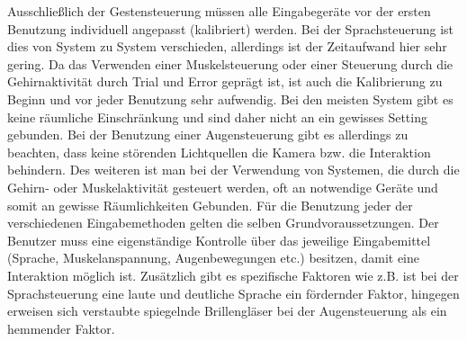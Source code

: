 \newline \newline
Ausschließlich der Gestensteuerung müssen alle Eingabegeräte vor der ersten Benutzung individuell angepasst (kalibriert) werden. Bei der Sprachsteuerung ist dies von System zu System verschieden, allerdings ist der Zeitaufwand hier sehr gering. Da das Verwenden einer Muskelsteuerung oder einer Steuerung durch die Gehirnaktivität durch Trial und Error geprägt ist, ist auch die Kalibrierung zu Beginn und vor jeder Benutzung sehr aufwendig.
\newline \newline
Bei den meisten System gibt es keine räumliche Einschränkung und sind daher nicht an ein gewisses Setting gebunden. Bei der Benutzung einer Augensteuerung gibt es allerdings zu beachten, dass keine störenden Lichtquellen die Kamera bzw. die Interaktion behindern. Des weiteren ist man bei der Verwendung von Systemen, die durch die Gehirn- oder Muskelaktivität gesteuert werden, oft an notwendige Geräte und somit an gewisse Räumlichkeiten Gebunden.
\newline \newline
Für die Benutzung jeder der verschiedenen Eingabemethoden gelten die selben Grundvoraussetzungen. Der Benutzer muss eine eigenständige Kontrolle über das jeweilige Eingabemittel (Sprache, Muskelanspannung, Augenbewegungen etc.) besitzen, damit eine Interaktion möglich ist. Zusätzlich gibt es spezifische Faktoren wie z.B. ist bei der Sprachsteuerung eine laute und deutliche Sprache ein fördernder Faktor, hingegen erweisen sich verstaubte spiegelnde Brillengläser bei der Augensteuerung als ein hemmender Faktor.
%
%
%
\newpage
